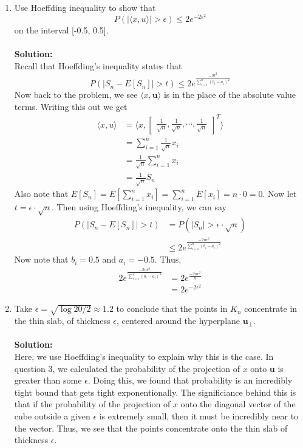 \documentclass[11pt]{article}
\begin{document}
\begin{enumerate}
	\item Use Hoeffding inequality to show that
	\begin{equation}
		P\left( \left| \langle x, u \rangle \right| > \epsilon \right) \le 2e^{-2\epsilon^2}
	\end{equation}
	on the interval [-0.5, 0.5]. \\\\
	\textbf{Solution:} \\
	Recall that Hoeffding's inequality states that
	\begin{equation*}
		P \left( \left| S_n - E[S_n] \right| > t \right) \le 2e^{\frac{-2t^2}{\sum_{i=1}^{n}(b_i - a_i)^2}}
	\end{equation*}
	Now back to the problem, we see $\langle x, \textbf{u} \rangle$ is in the place of the absolute value terms. Writing this out we get
	\begin{align*}
		\langle x, u \rangle &=  \langle x,
			\begin{bmatrix}
			\frac{1}{\sqrt{n}},
			\frac{1}{\sqrt{n}},
			\cdots,
			\frac{1}{\sqrt{n}}
		\end{bmatrix}^T \rangle \\
		&= \sum_{i=1}^{n} \frac{1}{\sqrt{n}}x_i \\
		&= \frac{1}{\sqrt{n}}\sum_{i=1}^{n} x_i \\
		&= \frac{1}{\sqrt{n}} S_n
	\end{align*}
	Also note that $E[S_n] = E[\sum_{i=1}^n x_i] = \sum_{i=1}^n E[x_i] = n \cdot 0 = 0$. Now let $t=\epsilon \cdot \sqrt{n}$. 
	Then using Hoeffding's inequality, we can say
	\begin{align*}
		P \left( \left| S_n - E[S_n] \right| > t \right) &= P \left( \left| S_n \right| > \epsilon \cdot \sqrt{n} \right) \\
		&\le 2e^{\frac{-2n\epsilon^2}{\sum_{i=1}^{n}(b_i - a_i)^2}}
	\end{align*}
	Now note that $b_i = 0.5$ and $a_i = -0.5$. Thus, 
	\begin{align*}
		2e^{\frac{-2n\epsilon^2}{\sum_{i=1}^{n}(b_i - a_i)^2}} &= 2e^{\frac{-2n\epsilon^2}{n}} \\
		&= 2e^{-2\epsilon^2}
	\end{align*}
	\item Take $\epsilon = \sqrt{\log20/2} \approx 1.2$ to conclude that the points in $K_n$ concentrate in the thin slab, of thickness $\epsilon$, centered around the hyperplane $\textbf{u}_\perp$. \\\\
	\textbf{Solution:} \\
	Here, we use Hoeffding's inequality to explain why this is the case. In question 3, we calculated the probability of the projection of $x$ onto \textbf{u} is greater than some $\epsilon$.
	Doing this, we found that probability is an incredibly tight bound that gets tight exponentionally. The significiance behind this is that if the probability of the projection of $x$ onto the diagonal vector of the cube outside a given $\epsilon$ is extremely small, then it must be incredibly near to the vector. 
	Thus, we see that the points concentrate onto the thin slab of thickness $\epsilon$.
	

\end{enumerate}
\end{document}
